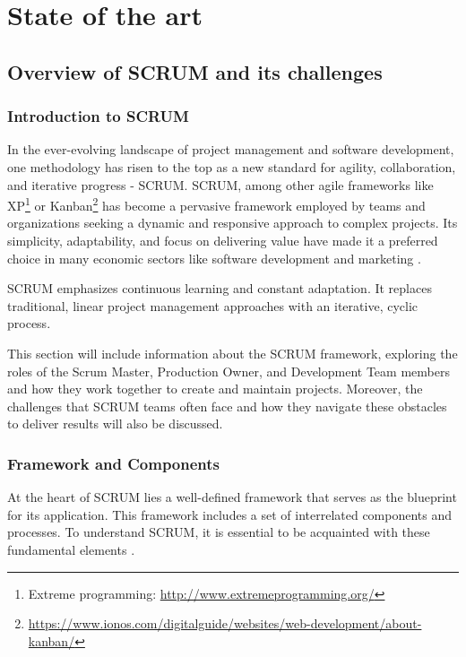 \chapter{State of the art}

\label{Chapter2}

\section{Overview of SCRUM and its challenges}
\subsection{Introduction to SCRUM}

In the ever-evolving landscape of project management and software development, 
one methodology has risen to the top as a new standard for agility, collaboration, 
and iterative progress - SCRUM. SCRUM, among other agile frameworks like XP\footnote{Extreme programming: \url{http://www.extremeprogramming.org/}} or Kanban\footnote{\url{https://www.ionos.com/digitalguide/websites/web-development/about-kanban/}} has become a pervasive framework employed by 
teams and organizations seeking a dynamic and responsive approach to complex projects. 
Its simplicity, adaptability, and focus on delivering value have made it a preferred 
choice in many economic sectors like software development 
and marketing \parencite{AgileTransformationSurvey}.

SCRUM emphasizes continuous learning and constant adaptation. 
It replaces traditional, linear project management approaches with an iterative, cyclic process. 

This section will include information about the SCRUM framework,
exploring the roles of the Scrum Master, Production Owner,
and Development Team members and how they work together to create and maintain projects. 
Moreover, the challenges that SCRUM teams often face and how they navigate these 
obstacles to deliver results will also be discussed. 

\subsection{Framework and Components}

At the heart of SCRUM lies a well-defined framework that serves as the blueprint for its application. This framework includes a set of interrelated components and processes. To understand SCRUM, it is essential to be acquainted with these fundamental elements \parencite{TheScrumGuide}.

